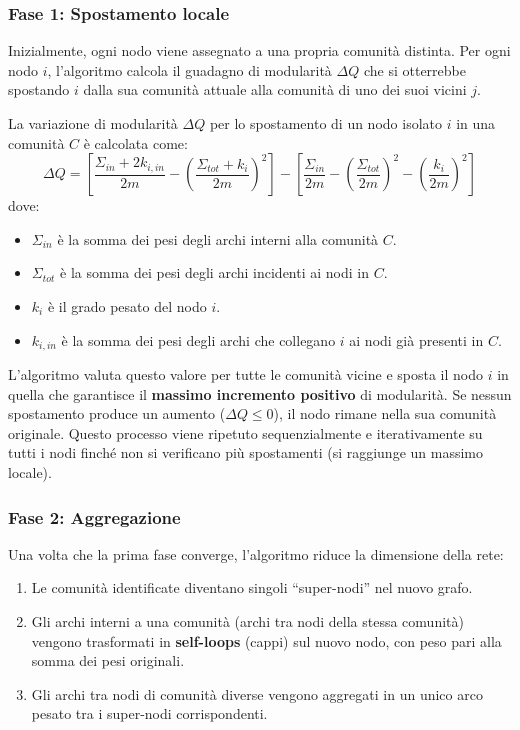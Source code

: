 \subsubsection{Fase 1: Spostamento locale}
Inizialmente, ogni nodo viene assegnato a una propria comunità distinta.
Per ogni nodo $i$, l'algoritmo calcola il guadagno di modularità $\Delta Q$
che si otterrebbe spostando $i$ dalla sua comunità attuale alla comunità
di uno dei suoi vicini $j$.

La variazione di modularità $\Delta Q$ per lo spostamento di un nodo isolato $i$
in una comunità $C$ è calcolata come:
\[
\Delta Q = \left[ \frac{\Sigma_{in} + 2k_{i,in}}{2m} - \left( \frac{\Sigma_{tot} + k_i}{2m} \right)^2 \right] - \left[ \frac{\Sigma_{in}}{2m} - \left( \frac{\Sigma_{tot}}{2m} \right)^2 - \left( \frac{k_i}{2m} \right)^2 \right]
\]
dove:
\begin{itemize}
    \item $\Sigma_{in}$ è la somma dei pesi degli archi interni alla comunità $C$.
    \item $\Sigma_{tot}$ è la somma dei pesi degli archi incidenti ai nodi in $C$.
    \item $k_i$ è il grado pesato del nodo $i$.
    \item $k_{i,in}$ è la somma dei pesi degli archi che collegano $i$ ai nodi già presenti in $C$.
\end{itemize}

L'algoritmo valuta questo valore per tutte le comunità vicine e sposta il nodo
$i$ in quella che garantisce il \textbf{massimo incremento positivo} di
modularità. Se nessun spostamento produce un aumento ($\Delta Q \le 0$),
il nodo rimane nella sua comunità originale.
Questo processo viene ripetuto sequenzialmente e iterativamente su tutti i nodi
finché non si verificano più spostamenti (si raggiunge un massimo locale).

\subsubsection{Fase 2: Aggregazione}
Una volta che la prima fase converge, l'algoritmo riduce la dimensione della rete:
\begin{enumerate}
    \item Le comunità identificate diventano singoli ``super-nodi'' nel nuovo grafo.
    \item Gli archi interni a una comunità (archi tra nodi della stessa comunità)
    vengono trasformati in \textbf{self-loops} (cappi) sul nuovo nodo, con peso
    pari alla somma dei pesi originali.
    \item Gli archi tra nodi di comunità diverse vengono aggregati in un unico
    arco pesato tra i super-nodi corrispondenti.
\end{enumerate}

